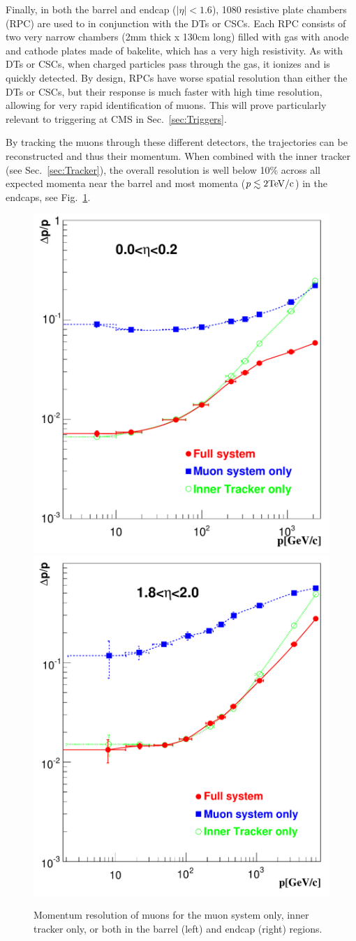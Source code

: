 Finally, in both the barrel and endcap ($|\eta|<1.6$), 1080 resistive plate chambers (RPC) are used to in conjunction with the DTs or CSCs. Each RPC consists of two very narrow chambers (2mm thick x 130cm long) filled with gas with anode and cathode plates made of bakelite, which has a very high resistivity. As with DTs or CSCs, when charged particles pass through the gas, it ionizes and is quickly detected. By design, RPCs have worse spatial resolution than either the DTs or CSCs, but their response is much faster with high time resolution, allowing for very rapid identification of muons. This will prove particularly relevant to triggering at CMS in Sec.~\ref{sec:Triggers}.

By tracking the muons through these different detectors, the trajectories can be reconstructed and thus their momentum. When combined with the inner tracker (see Sec.~\ref{sec:Tracker}), the overall resolution is well below 10\% across all expected momenta near the barrel and most momenta ($p \lesssim 2 \rm{TeV}/c$) in the endcaps, see Fig.~\ref{fig:MuonMomentumResolution}.

\begin{figure}[htbp]
\begin{center}
\includegraphics[width=.45\linewidth]{Experiment/figures/MuonMomentumResolution_smalleta.pdf}
\includegraphics[width=.45\linewidth]{Experiment/figures/MuonMomentumResolution_higheta.pdf}
\caption[Muon Momentum Resolution at CMS]{Momentum resolution of muons for the muon system only, inner tracker only, or both in the barrel (left) and endcap (right) regions.}
\label{fig:MuonMomentumResolution}
\end{center}
\end{figure}


